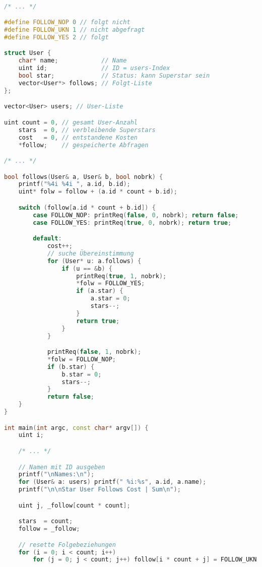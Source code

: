 \documentclass[a4paper,10pt,ngerman]{scrartcl}
\begin{document}
\begin{lstlisting}[language=C++]

/* ... */

#define FOLLOW_NOP 0 // folgt nicht
#define FOLLOW_UKN 1 // nicht abgefragt
#define FOLLOW_YES 2 // folgt

struct User {
    char* name;            // Name
    uint id;               // ID = users-Index
    bool star;             // Status: kann Superstar sein
    vector<User*> follows; // Folgt-Liste
};

vector<User> users; // User-Liste

uint count = 0, // gesamt User-Anzahl
    stars  = 0, // verbleibende Superstars
    cost   = 0, // entstandene Kosten
    *follow;    // gespeicherte Abfragen

/* ... */

bool follows(User& a, User& b, bool nobrk) {
    printf("%4i %4i ", a.id, b.id);
    uint* folw = follow + (a.id * count + b.id);

    switch (follow[a.id * count + b.id]) {
        case FOLLOW_NOP: printReq(false, 0, nobrk); return false;
        case FOLLOW_YES: printReq(true, 0, nobrk); return true;

        default:
            cost++;
            // suche Übereinstimmung
            for (User* u: a.follows) {
                if (u == &b) {
                    printReq(true, 1, nobrk);
                    *folw = FOLLOW_YES;
                    if (a.star) {
                        a.star = 0;
                        stars--;
                    }
                    return true;
                }
            }

            printReq(false, 1, nobrk);
            *folw = FOLLOW_NOP;
            if (b.star) {
                b.star = 0;
                stars--;
            }
            return false;
    }
}

int main(int argc, const char* argv[]) {
    uint i;

    /* ... */

    // Namen mit ID ausgeben
    printf("\nNames:\n");
    for (User& a: users) printf(" %i:%s", a.id, a.name);
    printf("\n\nStar User Follows Cost | Sum\n");

    uint j, _follow[count * count];

    stars  = count;
    follow = _follow;

    // resette Folgebeziehungen
    for (i = 0; i < count; i++)
        for (j = 0; j < count; j++) follow[i * count + j] = FOLLOW_UKN;


\end{lstlisting}
\end{document}
